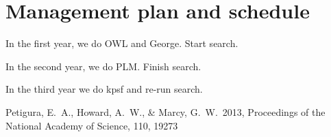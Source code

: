 \documentclass[letterpaper,12pt,preprint]{hack_aastex}
\begin{document}
\section{Management plan and schedule}

In the first year, we do OWL and George.  Start search.

In the second year, we do PLM.  Finish search.

In the third year we do kpsf and re-run search.

\clearpage
\begin{thebibliography}{}\raggedright%

Petigura, E.~A., Howard, A.~W., \& Marcy, G.~W.\ 2013,
Proceedings of the National Academy of Science, 110, 19273

\end{thebibliography}
\end{document}

